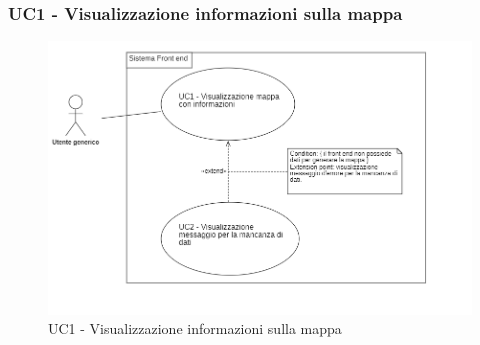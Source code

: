 \subsubsection{UC1 - Visualizzazione informazioni sulla mappa}\label{CasiDUsoCasiDUsoTraUnUtenteEIlFrontEndElencoCasiDUsoUC1VisualizzazioneInformazioniSullaMappa} %
\begin{center}
	\begin{figure}[H]
		\includegraphics[scale=0.8]{../immagini/attori_casi/uc1_uc2.png}
		\caption{UC1 - Visualizzazione informazioni sulla mappa}
	\end{figure}
\end{center}
